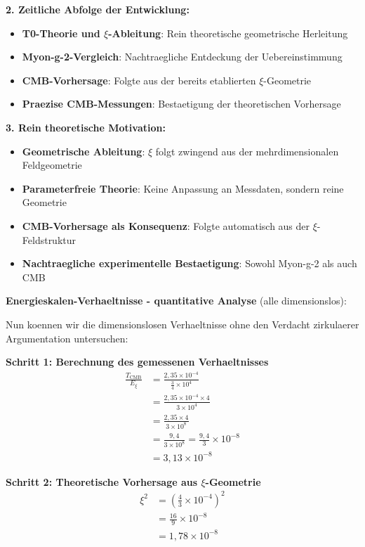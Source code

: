 \documentclass[12pt,a4paper]{article}
\begin{document}
	\textbf{2. Zeitliche Abfolge der Entwicklung:}
	\begin{itemize}
		\item \textbf{T0-Theorie und $\xi$-Ableitung}: Rein theoretische geometrische Herleitung
		\item \textbf{Myon-g-2-Vergleich}: Nachtraegliche Entdeckung der Uebereinstimmung 
		\item \textbf{CMB-Vorhersage}: Folgte aus der bereits etablierten $\xi$-Geometrie
		\item \textbf{Praezise CMB-Messungen}: Bestaetigung der theoretischen Vorhersage
	\end{itemize}
	
	\textbf{3. Rein theoretische Motivation:}
	\begin{itemize}
		\item \textbf{Geometrische Ableitung}: $\xi$ folgt zwingend aus der mehrdimensionalen Feldgeometrie
		\item \textbf{Parameterfreie Theorie}: Keine Anpassung an Messdaten, sondern reine Geometrie
		\item \textbf{CMB-Vorhersage als Konsequenz}: Folgte automatisch aus der $\xi$-Feldstruktur
		\item \textbf{Nachtraegliche experimentelle Bestaetigung}: Sowohl Myon-g-2 als auch CMB
	\end{itemize}
	
	\textbf{Energieskalen-Verhaeltnisse - quantitative Analyse} (alle dimensionslos):
	
	Nun koennen wir die dimensionslosen Verhaeltnisse ohne den Verdacht zirkulaerer Argumentation untersuchen:
	
	\textbf{Schritt 1: Berechnung des gemessenen Verhaeltnisses}
	\begin{align}
		\frac{T_{\text{CMB}}}{E_\xi} &= \frac{2{,}35 \times 10^{-4}}{\frac{3}{4} \times 10^4} \\
		&= \frac{2{,}35 \times 10^{-4} \times 4}{3 \times 10^4} \\
		&= \frac{2{,}35 \times 4}{3 \times 10^8} \\
		&= \frac{9{,}4}{3 \times 10^8} = \frac{9{,}4}{3} \times 10^{-8} \\
		&= 3{,}13 \times 10^{-8}
	\end{align}
	
	\textbf{Schritt 2: Theoretische Vorhersage aus $\xi$-Geometrie}
	\begin{align}
		\xi^2 &= \left(\frac{4}{3} \times 10^{-4}\right)^2 \\
		&= \frac{16}{9} \times 10^{-8} \\
		&= 1{,}78 \times 10^{-8}
	\end{align}
	
\end{document}
